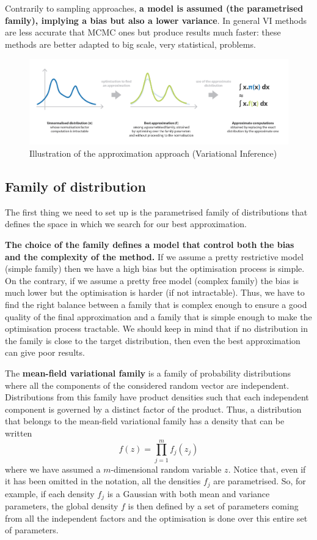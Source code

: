 Contrarily to sampling approaches, \textbf{a model is assumed (the parametrised family), implying a bias but also a lower variance}. In general VI methods are less accurate that MCMC ones but produce results much faster: these methods are better adapted to big scale, very statistical, problems.


\begin{figure}[h]
    \centering
\includegraphics[width=\textwidth]{pic/p05c08-snip06.png}
    \caption{Illustration of the approximation approach (Variational Inference)}
    \label{fig:p05c08-snip06}
\end{figure}

\subsection{Family of distribution}

The first thing we need to set up is the parametrised family of distributions that defines the space in which we search for our best approximation.

\textbf{The choice of the family defines a model that control both the bias and the complexity of the method. }If we assume a pretty restrictive model (simple family) then we have a high bias but the optimisation process is simple. On the contrary, if we assume a pretty free model (complex family) the bias is much lower but the optimisation is harder (if not intractable). Thus, we have to find the right balance between a family that is complex enough to ensure a good quality of the final approximation and a family that is simple enough to make the optimisation process tractable. We should keep in mind that if no distribution in the family is close to the target distribution, then even the best approximation can give poor results.

The \textbf{mean-field variational family} is a family of probability distributions where all the components of the considered random vector are independent. Distributions from this family have product densities such that each independent component is governed by a distinct factor of the product. Thus, a distribution that belongs to the mean-field variational family has a density that can be written
\begin{equation}f(z)=\prod_{j=1}^{m} f_{j}\left(z_{j}\right)\end{equation}
where we have assumed a $m$-dimensional random variable $z$. Notice that, even if it has been omitted in the notation, all the densities $f_j$ are parametrised. So, for example, if each density $f_j$ is a Gaussian with both mean and variance parameters, the global density $f$ is then defined by a set of parameters coming from all the independent factors and the optimisation is done over this entire set of parameters.


